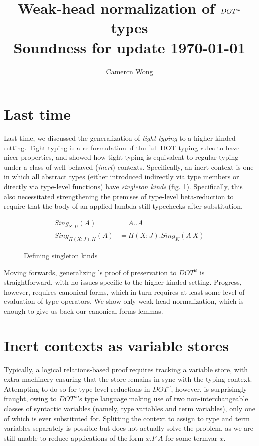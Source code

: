 \documentclass[a4paper, 10pt]{article}
\title{%
  Weak-head normalization of $\DOTw{}$ types \\
  \large Soundness for \DOTw{} update \today}
\author{Cameron Wong}
\newcommand{\DOTw}{\ensuremath{DOT^\omega}}
\newcommand{\interval}[3][]{#2 .._{#1} #3}
\newcommand{\KDepArr}[3]{\Pi(#1:#2).#3}
\newcommand{\Sing}[2]{Sing_{#2}(#1)}
\theoremstyle{definition}
\begin{document}
\maketitle

\setlength{\parskip}{\baselineskip}

\section{Last time}

Last time, we discussed the generalization of \emph{tight typing}
\citet{rapoport2017} to a higher-kinded setting. Tight typing is a
re-formulation of the full DOT typing rules to have nicer properties, and
showed how tight typing is equivalent to regular typing under a class of
well-behaved (\emph{inert}) contexts. Specifically, an inert context is one in
which all abstract types (either introduced indirectly via type members or
directly via type-level functions) have \emph{singleton kinds} (fig.
\ref{fig:singletons}). Specifically, this also necessitated strengthening the
premises of type-level beta-reduction to require that the body of an applied
lambda still typechecks after substitution.

\begin{figure}[ht!]
  \begin{align*}
    \Sing{A}{\interval{S}{U}} &= \interval{A}{A} \\
    \Sing{A}{\KDepArr{X}{J}{K}} &= \KDepArr{X}{J}{\Sing{A\ X}{K}}
  \end{align*}
  \caption{Defining singleton kinds}\label{fig:singletons}
\end{figure}

Moving forwards, generalizing \citet{rapoport2017}'s proof of preservation to
$\DOTw{}$ is straightforward, with no issues specific to the higher-kinded
setting. Progress, however, requires canonical forms, which in turn requires at
least some level of evaluation of type operators. We show only weak-head
normalization, which is enough to give us back our canonical forms lemmas.

\section{Inert contexts as variable stores}

Typically, a logical relations-based proof requires tracking a variable store,
with extra machinery ensuring that the store remains in sync with the typing
context. Attempting to do so for type-level reductions in $\DOTw{}$, however,
is surprisingly fraught, owing to $\DOTw{}$'s type language making use of two
non-interchangeable classes of syntactic variables (namely, type variables and
term variables), only one of which is ever substituted for. Splitting the
context to assign to type and term variables separately is possible
but does not actually solve the problem, as we are still unable to reduce
applications of the form $x.F\ A$ for some termvar $x$.
\end{document}
